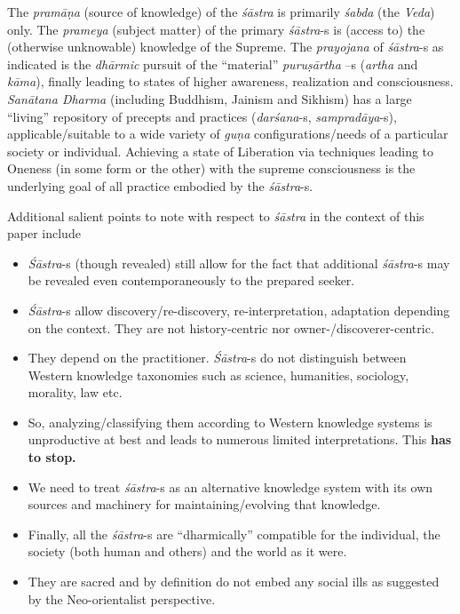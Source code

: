 The \textit{pramāṇa} (source of knowledge) of the \textit{śāstra} is primarily \textit{śabda} (the \textit{Veda}) only. The \textit{prameya} (subject matter) of the primary \textit{śāstra}-s is (access to) the (otherwise unknowable) knowledge of the Supreme. The \textit{prayojana} of \textit{śāstra}-s as indicated is the \textit{dhārmic} pursuit of the “material” \textit{puruṣārtha} –s (\textit{artha} and \textit{kāma}), finally leading to states of higher awareness, realization and consciousness. \textit{Sanātana Dharma} (including Buddhism, Jainism and Sikhism) has a large “living” repository of precepts and practices (\textit{darśana}-s, \textit{sampradāya}-s), applicable/suitable to a wide variety of \textit{guṇa} configurations/needs of a particular society or individual. Achieving a state of Liberation via techniques leading to Oneness (in some form or the other) with the supreme consciousness is the underlying goal of all practice embodied by the \textit{śāstra}-s.

Additional salient points to note with respect to \textit{śāstra} in the context of this paper include

\begin{itemize}
\item \textit{Śāstra}-s (though revealed) still allow for the fact that additional \textit{śāstra}-s may be revealed even contemporaneously to the prepared seeker.

 \item \textit{Śāstra}-s allow discovery/re-discovery, re-interpretation, adaptation depending on the context. They are not history-centric nor owner-/discoverer-centric. 

 \item They depend on the practitioner. \textit{Śāstra}-s do not distinguish between Western knowledge taxonomies such as science, humanities, sociology, morality, law etc.

 \item So, analyzing/classifying them according to Western knowledge systems is unproductive at best and leads to numerous limited interpretations. This \textbf{has to stop.}

 \item We need to treat \textit{śāstra}-s as an alternative knowledge system with its own sources and machinery for maintaining/evolving that knowledge.

 \item Finally, all the \textit{śāstra}-s are “dharmically” compatible for the individual, the society (both human and others) and the world as it were.

 \item They are sacred and by definition do not embed any social ills as suggested by the Neo-orientalist perspective.

\end{itemize}


